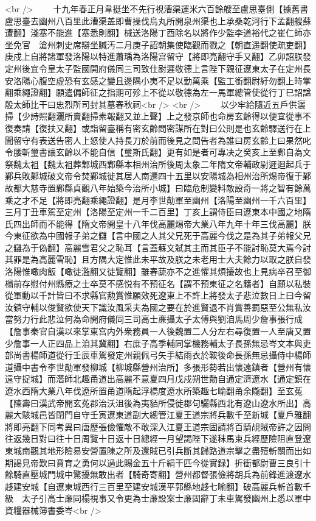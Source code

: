 <br />
　　十九年春正月韋挺坐不先行視漕渠運米六百餘艘至盧思臺側【據舊書盧思臺去幽州八百里此漕渠盖即曹操伐烏丸所開泉州渠也上承桑乾河行下孟翻艘蘇遭翻】淺塞不能進【塞悉則翻】械送洛陽丁酉除名以將作少監李道裕代之崔仁師亦坐免官　滄州刺史席辯坐贓汚二月庚子詔朝集使臨觀而戮之【朝直遥翻使疏吏翻】　庚戍上自將諸軍發洛陽以特進蕭瑀為洛陽宫留守【將即亮翻守手又翻】乙卯詔朕發定州後宜令皇太子監國開府儀同三司致仕尉遲敬德上言陛下親征遼東太子在定州長安洛陽心腹空虛恐有玄感之變且邊隅小夷不足以勤萬乘【監工銜翻尉紆勿翻上時掌翻乘繩證翻】願遣偏師征之指期可殄上不從以敬德為左一馬軍總管使從行丁巳詔諡殷太師比干曰忠烈所司封其墓春秋祠<br />
<br />
　　以少牢給隨近五戶供灑掃【少詩照翻灑所賣翻掃素報翻又並上聲】上之發京師也命房玄齡得以便宜從事不復奏請【復扶又翻】或詣留臺稱有密玄齡問密謀所在對曰公則是也玄齡驛送行在上聞留守有表送告密人上怒使人持長刀於前而後見之問告者為誰曰房玄齡上曰果然叱令腰斬璽書讓玄齡以不能自信【璽斯氏翻】更有如是者可專决之癸亥上至鄴自為文祭魏太袓【魏太袓葬鄴城西鄴縣本相州治所後周太象二年隋文帝輔政尉遲迴起兵于鄴兵敗鄴城破文帝令焚鄴城徙其居人南遷四十五里以安陽城為相州治所焬帝復于鄴故都大慈寺置鄴縣貞觀八年始築今治所小城】曰臨危制變料敵設奇一將之智有餘萬乘之才不足【將即亮翻乘繩證翻】是月李世勣軍至幽州【洛陽至幽州一千六百里】三月丁丑車駕至定州【洛陽至定州一千二百里】丁亥上謂侍臣曰遼東本中國之地隋氏四出師而不能得【隋文帝開皇十八年伐高麗焬帝大業八年九年十年三伐高麗】朕今東征欲為中國報子弟之讎【言中國之人其父兄死于高麗今伐之是為其子弟報父兄之讎為于偽翻】高麗雪君父之恥耳【言蓋蘇文弑其主而其臣子不能討恥莫大焉今討其罪是為高麗雪恥】且方隅大定惟此未平故及朕之未老用士大夫餘力以取之朕自發洛陽惟噉肉飯【噉徒濫翻又徒覽翻】雖春蔬亦不之進懼其煩擾故也上見病卒召至御榻前存慰付州縣療之士卒莫不感悦有不預征名【謂不預東征之名籍者】自願以私裝從軍動以千計皆曰不求縣官勲賞惟願效死遼東上不許上將發太子悲泣數日上曰今留汝鎮守輔以俊賢欲使天下識汝風采夫為國之要在於進賢退不肖賞善罰惡至公無私汝當努力行此悲泣何為命開府儀同三司高士亷攝太子太傅與劉洎馬周少詹事張行成【詹事秦官自漢以來掌東宫内外衆務員一人後魏置二人分左右尋復置一人至唐又置少詹事一人正四品上洎其冀翻】右庶子高季輔同掌機務輔太子長孫無忌岑文本與吏部尚書楊師道從行壬辰車駕發定州親佩弓矢手結雨衣於鞍後命長孫無忌攝侍中楊師道攝中書令李世勣軍發柳城【柳城縣營州治所】多張形勢若出懷遠鎮者【營州有懷遠守捉城】而濳師北趣甬道出高麗不意夏四月戊戍朔世勣自通定濟遼水【通定鎮在遼水西隋大業八年伐遼所置甬道隋起浮橋度遼水所築趣七喻翻甬余隴翻】至玄菟【陳壽曰漢武帝開玄菟郡治沃沮後為夷貊所侵徙郡句驪縣西北有遼山遼水所出】高麗大駭城邑皆閉門自守壬寅遼東道副大總管江夏王道宗將兵數千至新城【夏戶雅翻將即亮翻下同考異曰唐歷張儉懼敵不敢深入江夏王道宗固請將百騎覘賊帝許之因問往返幾日對曰往十日周覽十日返十日總經一月望謁陛下遂秣馬束兵經歷險阻直登遼東城南觀其地形險易安營置陳之所及還賊已引兵斷其歸路道宗擊之盡殪斬關而出如期謁見帝歎曰賁育之勇何以過此賜金五十斤絹干匹今從實録】折衝都尉曹三良引十餘騎直壓城門城中驚擾無敢出者【騎奇寄翻】營州都督張儉將胡兵為前鋒進渡遼水趍建安城【自遼東城西行三百里至建安城漢平郭縣地趍七喻翻】破高麗兵斬首數千級　太子引高士亷同榻視事又令更為士亷設案士亷固辭丁未車駕發幽州上悉以軍中資糧器械簿書委岑<br />
